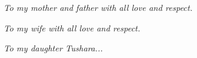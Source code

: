 \chapter*{}
\thispagestyle{empty}	%


\begin{flushleft}
\textsl{To my mother and father with all love and respect.}
\end{flushleft}

\begin{flushleft}
\textsl{To my wife  with all love and respect.}
\end{flushleft}

\begin{flushleft}
\textsl{To my daughter Tushara...}
\end{flushleft}
